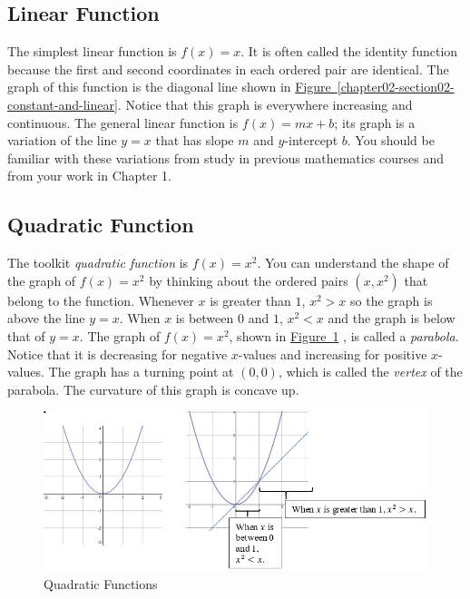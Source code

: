 \documentclass[10pt,]{book}
\theoremstyle{ptxdefinitionnotitle}
\theoremstyle{ptxdefinitiontitle}
\numberwithin{equation}{section}
\newcommand{\lt}{<}
\newcommand{\gt}{>}
\begin{document}
\subsection[{Linear Function}]{Linear Function}\label{subsection-3}
\hypertarget{p-43}{}%
The simplest linear function is \(f(x) = x\).  It is often called the identity function because the first and second coordinates in each ordered pair are identical.  The graph of this function is the diagonal line shown in \hyperref[chapter02-section02-constant-and-linear]{Figure~\ref{chapter02-section02-constant-and-linear}}.  Notice that this graph is everywhere increasing and continuous.  The general linear function is \(f(x) = mx+ b\); its graph is a variation of the line \(y = x\) that has slope \(m\) and \(y\)-intercept \(b\).  You should be familiar with these variations from study in previous mathematics courses and from your work in Chapter 1.%
\typeout{************************************************}
\typeout{************************************************}
\subsection[{Quadratic Function}]{Quadratic Function}\label{subsection-4}
\hypertarget{p-44}{}%
The toolkit \emph{quadratic function} is \(f(x) = x^2\).  You can understand the shape of the graph of \(f(x) = x^2\) by thinking about the ordered pairs \(\left( x , x^2 \right)\) that belong to the function.  Whenever \(x\) is greater than \(1\), \(x^2 \gt x\) so the graph is above the line \(y = x\).  When \(x\) is between \(0\) and \(1\), \(x^2 \lt x\) and the graph is below that of \(y = x\).  The graph of \(f(x) = x^2\), shown in \hyperref[chapter02-section02-quadratic]{Figure~\ref{chapter02-section02-quadratic}} , is called a \emph{parabola}.  Notice that it is decreasing for negative \(x\)-values and increasing for positive \(x\)-values.  The graph has a turning point at \(\left( 0, 0 \right)\), which is called the \emph{vertex} of the parabola.  The curvature of this graph is concave up.%
\begin{figure}
\centering
\includegraphics[width=1\linewidth]{./src/images/chapter02/chapter02section02-quadratic.png}
\caption{Quadratic Functions\label{chapter02-section02-quadratic}}
\end{figure}
\typeout{************************************************}
\typeout{************************************************}
\end{document}
